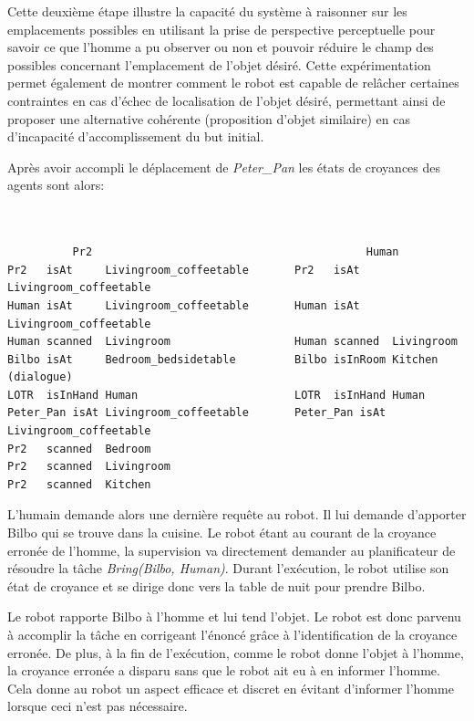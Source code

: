 \documentclass[a4paper,11pt,twoside]{StyleThese}
\begin{document}
Cette deuxième étape illustre la capacité du système à raisonner sur les emplacements possibles en utilisant la prise de perspective perceptuelle pour savoir ce que l'homme a pu observer ou non et pouvoir réduire le champ des possibles concernant l'emplacement de l'objet désiré. Cette expérimentation permet également de montrer comment le robot est capable de relâcher certaines contraintes en cas d'échec de localisation de l'objet désiré, permettant ainsi de proposer une alternative cohérente (proposition d'objet similaire) en cas d'incapacité d'accomplissement du but initial.


Après avoir accompli le déplacement de \textit{Peter\_Pan} les états de croyances des agents sont alors:

\begin{scriptsize}
\begin{verbatim}


          Pr2                                          Human
Pr2   isAt     Livingroom_coffeetable       Pr2   isAt     Livingroom_coffeetable
Human isAt     Livingroom_coffeetable       Human isAt     Livingroom_coffeetable
Human scanned  Livingroom                   Human scanned  Livingroom
Bilbo isAt     Bedroom_bedsidetable         Bilbo isInRoom Kitchen (dialogue)
LOTR  isInHand Human                        LOTR  isInHand Human 
Peter_Pan isAt Livingroom_coffeetable       Peter_Pan isAt Livingroom_coffeetable 
Pr2   scanned  Bedroom
Pr2   scanned  Livingroom
Pr2   scanned  Kitchen

\end{verbatim}
\end{scriptsize}

L'humain demande alors une dernière requête au robot.
Il lui demande d'apporter Bilbo qui se trouve dans la cuisine.
Le robot étant au courant de la croyance erronée de l'homme, la supervision va directement demander au planificateur de résoudre la tâche \textit{Bring(Bilbo, Human)}. Durant l'exécution, le robot utilise son état de croyance et se dirige donc vers la table de nuit pour prendre Bilbo.

Le robot rapporte Bilbo à l'homme et lui tend l'objet.
Le robot est donc parvenu à accomplir la tâche en corrigeant l'énoncé grâce à l'identification de la croyance erronée. De plus, à la fin de l'exécution, comme le robot donne l'objet à l'homme, la croyance erronée a disparu sans que le robot ait eu à en informer l'homme.
Cela donne au robot un aspect efficace et discret en évitant d'informer l'homme lorsque ceci n'est pas nécessaire.
\end{document}
